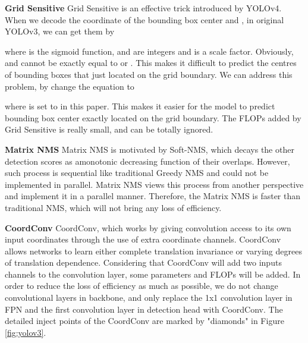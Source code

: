 \documentclass[10pt,twocolumn,letterpaper]{article}
\newcommand{\pheadB}[1] {\vspace{1mm}\noindent\textbf{#1}}
\begin{document}
	\pheadB{Grid Sensitive}\cite{yolov4}
	Grid Sensitive is an effective trick introduced by YOLOv4. 
	When we decode the coordinate of the bounding box center  and , in original YOLOv3, we can get them by
	
	where  is the sigmoid function,  and  are integers and  is a scale factor. Obviously,  and  cannot be exactly equal to  or .
	This makes it difficult to predict the centres of bounding boxes that just located on the grid boundary. We can address this problem, by change the equation to 
	
	where  is set to  in this paper. This makes it easier for the model to predict bounding box center exactly located on the grid boundary. The FLOPs added by Grid Sensitive is really small, and can be totally ignored.
	
	\pheadB{Matrix NMS} \cite{solov2}
	Matrix NMS is motivated by Soft-NMS, which decays the other detection scores as amonotonic decreasing function of their overlaps. However, such process is sequential like traditional Greedy NMS and could not be implemented in parallel. Matrix NMS views this process from another perspective and implement it in a parallel manner.
	Therefore, the Matrix NMS is faster than traditional NMS, which will not bring any loss of efficiency.
	
	\pheadB{CoordConv} \cite{coordconv}
	CoordConv, which works by giving convolution access to its own input coordinates through the use of extra coordinate channels.  CoordConv allows networks to learn either complete translation invariance or varying degrees of translation dependence. Considering that CoordConv will add two inputs channels to the convolution layer, some parameters and FLOPs will be added. In order to reduce the loss of efficiency as much as possible, we do not change convolutional layers in backbone, and only replace the 1x1 convolution layer in FPN and the first convolution layer in detection head with CoordConv.
	The detailed inject points of the CoordConv are marked by "diamonds" in Figure \ref{fig:yolov3}.
	
\end{document}
